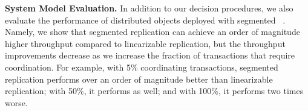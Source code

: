 \vspace{4pt}
\textbf{System Model Evaluation.}
In addition to our decision procedures, we also evaluate the performance of
distributed objects deployed with segmented
\invariantconfluence{}~\cite{whittaker2018interactive}.
%
Namely, we show that segmented \invariantconfluent{} replication can achieve an
order of magnitude higher throughput compared to linearizable replication, but
the throughput improvements decrease as we increase the fraction of
transactions that require coordination. For example, with 5\% coordinating
transactions, segmented \invariantconfluent{} replication performs over an
order of magnitude better than linearizable replication; with 50\%, it performs
as well; and with 100\%, it performs two times worse.
%
